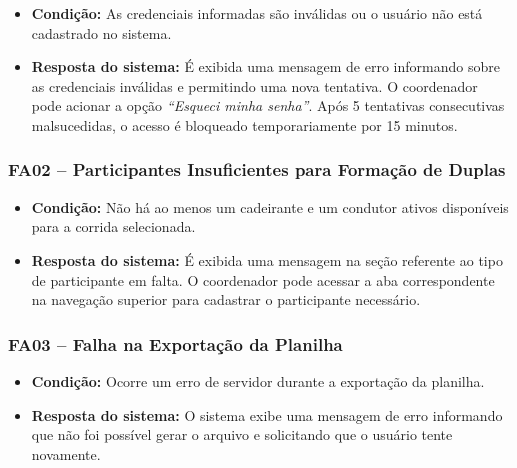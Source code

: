 \documentclass[12pt,a4paper]{article}
\begin{document}
\begin{itemize}
    \item \textbf{Condição:} As credenciais informadas são inválidas ou o usuário não
    está cadastrado no sistema.
    \item \textbf{Resposta do sistema:} É exibida uma mensagem de erro informando sobre
    as credenciais inválidas e permitindo uma nova tentativa. O coordenador pode acionar
    a opção \textit{``Esqueci minha senha''}. Após 5 tentativas consecutivas
    malsucedidas, o acesso é bloqueado temporariamente por 15 minutos.
\end{itemize}

\FloatBarrier

\subsubsection{FA02 – Participantes Insuficientes para Formação de Duplas}

\begin{itemize}
    \item \textbf{Condição:} Não há ao menos um cadeirante e um condutor ativos
    disponíveis para a corrida selecionada.
    \item \textbf{Resposta do sistema:} É exibida uma mensagem na seção referente ao
    tipo de participante em falta. O coordenador pode acessar a aba correspondente na
    navegação superior para cadastrar o participante necessário.
\end{itemize}

\FloatBarrier

\subsubsection{FA03 – Falha na Exportação da Planilha}

\begin{itemize}
    \item \textbf{Condição:} Ocorre um erro de servidor durante a exportação da planilha.
    \item \textbf{Resposta do sistema:} O sistema exibe uma mensagem de erro informando
    que não foi possível gerar o arquivo e solicitando que o usuário tente novamente.
\end{itemize}

\end{document}
